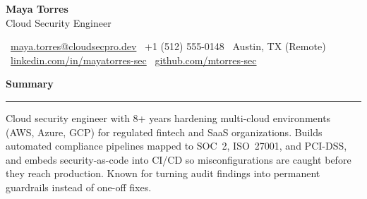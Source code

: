 \documentclass[10pt,letterpaper]{article}
\newcommand{\sechead}[1]{%
  \vspace{1pt}
  {\color{navy}\large\bfseries #1}\par
  \vspace{-7pt}
  {\color{accent}\rule{\linewidth}{1.1pt}}\par
  \vspace{1pt}
}
\begin{document}
\begin{center}
  {\fontsize{26}{28}\selectfont\bfseries\color{navy} Maya Torres}\\[2pt]
  {\Large\color{accent} Cloud Security Engineer}
\end{center}

\vspace{1pt}
\noindent{\color{accent}\rule{\linewidth}{1.6pt}}
\vspace{2pt}

\begin{center}
\small
\faEnvelope\ \href{mailto:maya.torres@cloudsecpro.dev}{maya.torres@cloudsecpro.dev} \quad\textbullet\quad
\faPhone\ +1 (512) 555-0148 \quad\textbullet\quad
\faMapMarker\ Austin, TX (Remote) \quad\textbullet\quad
\faLinkedin\ \href{https://linkedin.com/in/mayatorres-sec}{linkedin.com/in/mayatorres-sec} \quad\textbullet\quad
\faGithub\ \href{https://github.com/mtorres-sec}{github.com/mtorres-sec}
\end{center}

\sechead{Summary}
\small
Cloud security engineer with 8+ years hardening multi-cloud environments (AWS, Azure, GCP) for
regulated fintech and SaaS organizations. Builds automated compliance pipelines mapped to
SOC~2, ISO~27001, and PCI-DSS, and embeds security-as-code into CI/CD so misconfigurations are
caught before they reach production. Known for turning audit findings into permanent guardrails
instead of one-off fixes.
\end{document}
